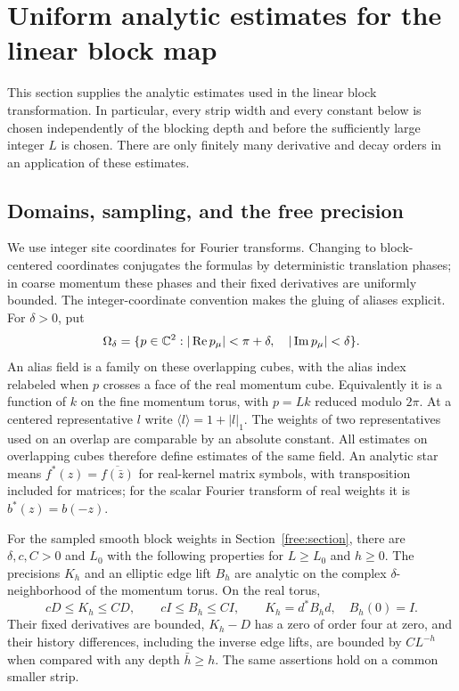 \section{Uniform analytic estimates for the linear block map}
\label{app:analytic-block}

This section supplies the analytic estimates used in the linear block
transformation.  In particular, every strip width and every constant below
is chosen independently of the blocking depth and before the sufficiently
large integer $L$ is chosen.  There are only finitely many derivative and
decay orders in an application of these estimates.

\subsection{Domains, sampling, and the free precision}

We use integer site coordinates for Fourier transforms.  Changing to
block-centered coordinates conjugates the formulas by deterministic
translation phases; in coarse momentum these phases and their fixed
derivatives are uniformly bounded.  The integer-coordinate convention
makes the gluing of aliases explicit.  For $\delta>0$, put
\[
 \Omega_\delta=\{p\in\mathbb C^2:
       |\mathop{\rm Re}p_\mu|<\pi+\delta,\quad
       |\mathop{\rm Im}p_\mu|<\delta\}.
\]
An alias field is a family on these overlapping cubes, with the alias
index relabeled when $p$ crosses a face of the real momentum cube.
Equivalently it is a function of $k$ on the fine momentum torus, with
$p=Lk$ reduced modulo $2\pi$.  At a centered representative $l$ write
$\langle l\rangle=1+|l|_1$.  The weights of two representatives used
on an overlap are comparable by an absolute constant.  All estimates
on overlapping cubes therefore define estimates of the same field.
An analytic star means $f^*(z)=\overline{f(\bar z)}$ for real-kernel
matrix symbols, with transposition included for matrices; for the
scalar Fourier transform of real weights it is $b^*(z)=b(-z)$.

\begin{lemma}\label{app:free-strip}
For the sampled smooth block weights in Section~\ref{free:section},
there are $\delta,c,C>0$ and $L_0$ with the following properties for
$L\ge L_0$ and $h\ge0$.  The precisions $K_h$ and an elliptic edge lift
$B_h$ are analytic on the complex $\delta$-neighborhood of the momentum
torus.  On the real torus,
\[
 cD\le K_h\le CD,\qquad cI\le B_h\le CI,
 \qquad K_h=d^*B_hd,\quad B_h(0)=I.
\]
Their fixed derivatives are bounded, $K_h-D$ has a zero of order four
at zero, and their history differences, including the inverse edge
lifts, are bounded by $CL^{-h}$ when compared with any depth
$\bar h\ge h$.  The same assertions hold on a common smaller strip.
\end{lemma}

